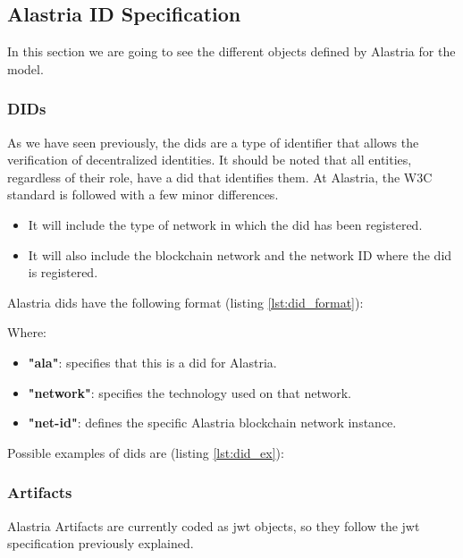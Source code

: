 \subsection{Alastria ID Specification}
In this section we are going to see the different objects defined by Alastria for the model.
\subsubsection{DIDs}
As we have seen previously, the \acrfull{did}s are a type of identifier that allows the verification of decentralized identities. It should be noted that all entities, regardless of their role, have a \acrshort{did} that identifies them. At Alastria, the W3C standard is followed with a few minor differences.
\begin{itemize}
    \item It will include the type of network in which the \acrshort{did} has been registered.
    \item It will also include the blockchain network and the network ID where the \acrshort{did} is registered.
\end{itemize}

Alastria \acrshort{did}s have the following format (listing \ref{lst:did_format}):

Where:
\begin{itemize}
    \item \textbf{"ala"}: specifies that this is a \acrshort{did} for Alastria.
    \item \textbf{"network"}: specifies the technology used on that network.
    \item \textbf{"net-id"}: defines the specific Alastria blockchain network instance.
\end{itemize}
Possible examples of \acrshort{did}s are (listing \ref{lst:did_ex}):


\subsubsection{Artifacts}
Alastria Artifacts are currently coded as \acrshort{jwt} objects, so they follow the \acrshort{jwt} specification previously explained.

